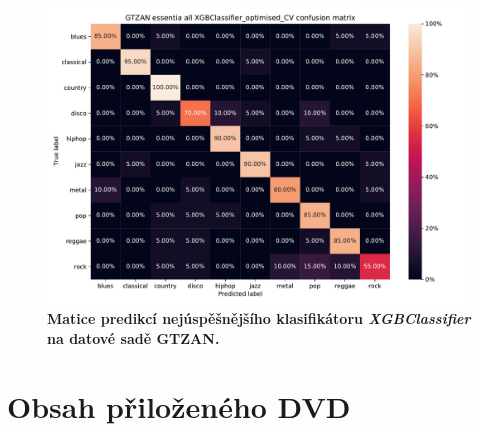 \begin{figure}[h]
    \centering
    \includegraphics[width=\textwidth]{obrazky/GTZAN_essentia_all_XGBClassifier_optimised_CV_TS.pdf}
    \caption{\textbf{Matice predikcí nejúspěšnějšího klasifikátoru \textit{XGBClassifier} na datové sadě GTZAN.}}
    \label{obr_matice_predikce_GTZAN}
\end{figure}

\chapter{Obsah přiloženého DVD}
\label{obsah_prilozeneho_dvd}

